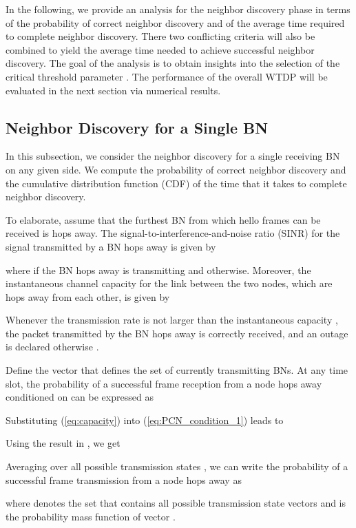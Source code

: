\documentclass[10pt,english,two column]{IEEEtran}
\begin{document}
In the following, we provide an analysis for the neighbor discovery
phase in terms of the probability of correct neighbor discovery and
of the average time required to complete neighbor discovery. There
two conflicting criteria will also be combined to yield the average
time needed to achieve successful neighbor discovery. The goal of
the analysis is to obtain insights into the selection of the critical
threshold parameter . The performance of the overall WTDP
will be evaluated in the next section via numerical results. 


\subsection{Neighbor Discovery for a Single BN }

In this subsection, we consider the neighbor discovery for a single
receiving BN on any given side. We compute the probability 
of correct neighbor discovery and the cumulative distribution function
(CDF)  of the time  that it takes
to complete neighbor discovery. 

To elaborate, assume that the furthest BN from which hello frames
can be received is  hops away. The signal-to-interference-and-noise
ratio (SINR) for the signal transmitted by a BN  hops away is
given by 

where  if the BN  hops away is transmitting and 
otherwise. Moreover, the instantaneous channel capacity for the link
between the two nodes, which are  hops away from each other, is
given by \cite{cover} 

Whenever the transmission rate 
is not larger than the instantaneous capacity , the packet
transmitted by the BN  hops away is correctly received, and an
outage is declared otherwise \cite{Tse}. 

Define the vector  that defines
the set of currently transmitting BNs. At any time slot, the probability
of a successful frame reception from a node  hops away conditioned
on  can be expressed as

Substituting (\ref{eq:capacity}) into (\ref{eq:PCN_condition_1})
leads to

 Using the result in \cite{Boyd}, we get

Averaging over all possible transmission states , we
can write the probability of a successful frame transmission from
a node  hops away as

where  denotes the set that contains all possible
 transmission state vectors and 
is the probability mass function of vector .
\end{document}
